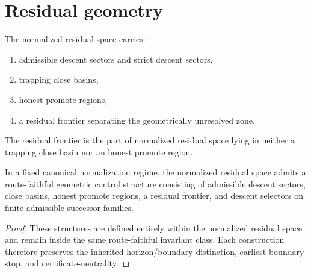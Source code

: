 \section{Residual geometry}
\begin{definition}\label{def:normalized-residual-geometry}
The normalized residual space carries:
\begin{enumerate}[leftmargin=2em]
  \item admissible descent sectors and strict descent sectors,
  \item trapping close basins,
  \item honest promote regions,
  \item a residual frontier separating the geometrically unresolved zone.
\end{enumerate}
\end{definition}

\begin{definition}\label{def:residual-frontier}
The residual frontier is the part of normalized residual space lying in neither a trapping close basin nor an honest promote region.
\end{definition}

\begin{theorem}\label{thm:geometric-control}
In a fixed canonical normalization regime, the normalized residual space admits a route-faithful geometric control structure consisting of admissible descent sectors, close basins, honest promote regions, a residual frontier, and descent selectors on finite admissible successor families.
\end{theorem}

\begin{proof}
These structures are defined entirely within the normalized residual space and remain inside the same route-faithful invariant class. Each construction therefore preserves the inherited horizon/boundary distinction, earliest-boundary stop, and certificate-neutrality.
\end{proof}

